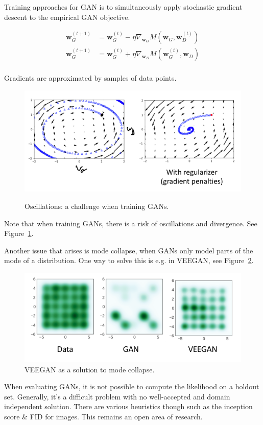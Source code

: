 \documentclass[a4paper,10pt,twoside]{article}
\begin{document}
Training approaches for GAN is to simultaneously apply stochastic gradient descent to the empirical GAN objective.

\begin{align*}
  \mathbf{w}_G^{(t+1)} &= \mathbf{w}_G^{(t)} - \eta\nabla_{\mathbf{w}_G}M(\mathbf{w}_G,\mathbf{w}_D^{(t)})\\
  \mathbf{w}_G^{(t+1)} &= \mathbf{w}_G^{(t)} + \eta\nabla_{\mathbf{w}_D}M(\mathbf{w}_G^{(t)},\mathbf{w}_D)\\
\end{align*}

Gradients are approximated by samples of data points.

\begin{figure}
  \centering
  \includegraphics[width=.6\textwidth]{figures/oscillations_gan_training.png}
  \label{fig:oscillations_gan_training}
  \caption{Oscillations: a challenge when training GANs.}
\end{figure}


Note that when training GANs, there is a risk of oscillations and divergence. See Figure~\ref{fig:oscillations_gan_training}.


Another issue that arises is mode collapse, when GANs only model parts of the mode of a distribution. One way to solve this is e.g. in VEEGAN, see Figure~\ref{fig:mode_collapse}.

\begin{figure}
  \centering
  \includegraphics[width=.5\textwidth]{figures/gan_mode_collapse.png}
  \caption{VEEGAN as a solution to mode collapse.}
  \label{fig:mode_collapse}
\end{figure}

When evaluating GANs, it is not possible to compute the likelihood on a holdout set. Generally, it's a difficult problem with no well-accepted and domain independent solution. There are various heuristics though such as the inception score \& FID for images. This remains an open area of research.
\end{document}
